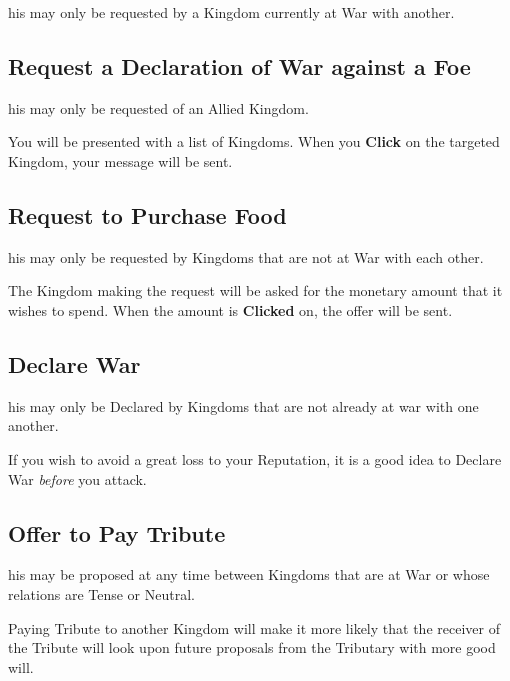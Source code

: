 
his may only be requested by a Kingdom currently at War with another.

\subsection{\textsf{Request a Declaration of War against a Foe}}


his may only be requested of an Allied Kingdom.

You will be presented with a list of Kingdoms. When you \textbf{Click} on the targeted Kingdom, your message will be sent.

\subsection{\textsf{Request to Purchase Food}}


his may only be requested by Kingdoms that are not at War with each other.

The Kingdom making the request will be asked for the monetary amount that it wishes to spend. When the amount is \textbf{Clicked} on, the offer will be sent.

\subsection{\textsf{Declare War}}


his may only be Declared by Kingdoms that are not already at war with one another.

If you wish to avoid a great loss to your Reputation, it is a good idea to Declare War \textit{before} you attack.

\subsection{\textsf{Offer to Pay Tribute}}


his may be proposed at any time between Kingdoms that are at War or whose relations are Tense or Neutral.

Paying Tribute to another Kingdom will make it more likely that the receiver of the Tribute will look upon future proposals from the Tributary with more good will.

